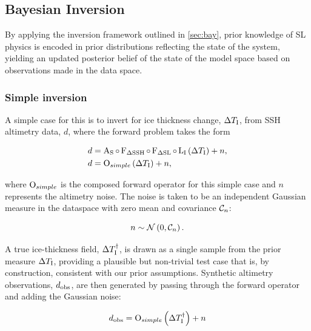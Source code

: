 \subsection{Bayesian Inversion}


By applying the inversion framework outlined in \autoref{sec:bay}, prior knowledge of SL physics is encoded in prior distributions reflecting the state of the system, yielding an updated posterior belief of the state of the model space based on observations made in the data space.



\subsubsection{Simple inversion}


A simple case for this is to invert for ice thickness change, $\Delta T_\text{I}$, from SSH altimetry data, $d$, where the forward problem takes the form

\begin{align}
	d &= \operatorname{{A}}_{{\mathrm{S}}} \circ \operatorname{{F}}_{{\Delta \mathrm{SSH}}} \circ \operatorname{{F}}_{{\Delta \mathrm{SL}}} \circ \operatorname{{L}}_{{\text{I}}} \left(\Delta T_\text{I}\right) + n,\\
	d &= \operatorname{{O}}_{{simple}}\left(\Delta T_\text{I}\right) + n, \label{eq:simple_case}
\end{align}

where $\operatorname{{O}}_{{simple}}$ is the composed forward operator for this simple case and $n$ represents the altimetry noise. The noise is taken to be an independent Gaussian measure in the dataspace with zero mean and covariance $\mathcal{C}_{n}$:

\begin{equation}
	n \sim \mathcal{N}\left(0, \mathcal{C}_{n}\right).
\end{equation}

A true ice-thickness field, $\Delta T_\text{I}^\dagger$,  is drawn as a single sample from the prior measure $\Delta T_\text{I}$, providing a plausible but non-trivial test case that is, by construction, consistent with our prior assumptions. Synthetic altimetry observations, $d_{\text{obs}}$, are then generated by passing through the forward operator and adding the Gaussian noise:

\begin{equation}
	d_{\text{obs}} = \operatorname{{O}}_{{simple}}\left(\Delta T_\text{I}^\dagger\right) + n
\end{equation}

